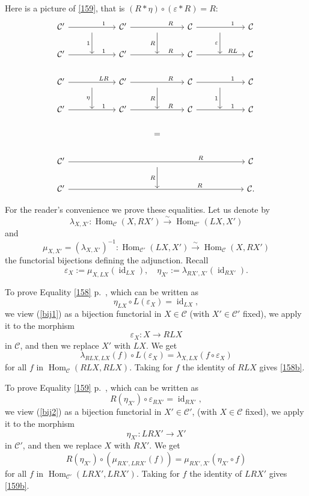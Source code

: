\documentclass[12pt]{article}
\theoremstyle{remark}
\theoremstyle{definition}
\newcommand{\C}{\mathcal C}
\DeclareMathOperator{\id}{id}
\DeclareMathOperator{\Hom}{Hom}%
\begin{document}
Here is a picture of \eqref{159}, that is $(R*\eta)\circ(\varepsilon*R)=R$: 
$$
\begin{tikzcd}
%
\C'\ar{rr}{}[near end]{1}&\ar{d}[swap]{1}&\C'\ar{rr}{}[near end]{R}&\ar{d}[swap]{R}&\C\ar{rr}{}[near end]{1}&\ar{d}[swap]{\varepsilon}&\C\\ 
%
\C'\ar{rr}{}[near end]{1}&{}&\C'\ar{rr}{}[near end]{R}&{}&\C\ar{rr}{}[near end]{RL}&{}&\C\\ 
%
\C'\ar{rr}{}[near end]{LR}&\ar{d}[swap]{\eta}&\C'\ar{rr}{}[near end]{R}&\ar{d}[swap]{R}&\C\ar{rr}{}[near end]{1}&\ar{d}[swap]{1}&\C\\ 
%
\C'\ar{rr}{}[near end]{1}&{}&\C'\ar{rr}{}[near end]{R}&{}&\C\ar{rr}{}[near end]{1}&{}&\C\\ 
%
&&&=\\ 
%
\C'\ar{rrrrrr}[near end]{R}&&&{}\ar{d}[swap]{R}&&&\C\\
%
\C'\ar{rrrrrr}[near end]{R}&&&{}&&&\C.
%
\end{tikzcd}
$$ 

For the reader's convenience we prove these equalities. Let us denote by
%
\begin{equation}\label{bij1}
\lambda_{X,X'}:\Hom_\C(X,RX')\overset\sim\to\Hom_{\C'}(LX,X')
\end{equation} 
%
and 
%
\begin{equation}\label{bij2}
\mu_{X,X'}=(\lambda_{X,X'})^{-1}:\Hom_{\C'}(LX,X')\overset\sim\to\Hom_\C(X,RX')
\end{equation} 
%
the functorial bijections defining the adjunction. Recall 
$$
\varepsilon_X:=\mu_{X,LX}(\id_{LX}),\quad\eta_{X'}:=\lambda_{RX',X'}(\id_{RX'}).
$$ 

To prove Equality \eqref{158} p.~\pageref{158}, which can be written as 
%
\begin{equation}\label{158b} 
\eta_{LX}\circ L(\varepsilon_X)=\id_{LX}, 
\end{equation}
%
we view (\ref{bij1}) as a bijection functorial in $X\in\C$ (with $X'\in\C'$ fixed), we apply it to the morphism 
$$
\varepsilon_X:X\to RLX
$$ 
in $\C$, and then we replace $X'$ with $LX$. We get 
$$
\lambda_{RLX,LX}(f)\circ L(\varepsilon_X)=\lambda_{X,LX}(f\circ\varepsilon_X)
$$
for all $f$ in $\Hom_\C(RLX,RLX)$. Taking for $f$ the identity of $RLX$ gives \eqref{158b}.

To prove Equality \eqref{159} p.~\pageref{159}, which can be written as 
%
\begin{equation}\label{159b} 
R(\eta_{X'})\circ\varepsilon_{RX'}=\id_{RX'},
\end{equation}
%
we view (\ref{bij2}) as a bijection functorial in $X'\in\C'$, (with $X\in\C$ fixed), we apply it to the morphism 
$$
\eta_{X'}:LRX'\to X'
$$ 
in $\C'$, and then we replace $X$ with $RX'$. We get 
$$
R(\eta_{X'})\circ(\mu_{RX',LRX'}(f))=\mu_{RX',X'}(\eta_{X'}\circ f)
$$
for all $f$ in $\Hom_{\C'}(LRX',LRX')$. Taking for $f$ the identity of $LRX'$ gives \eqref{159b}.
%
\end{document}
